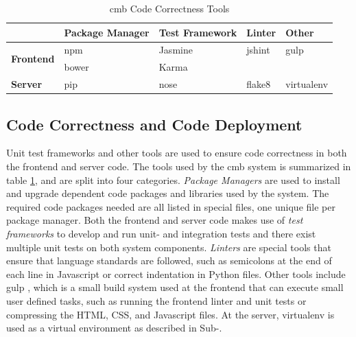 \begin{table}[b!]
  \centering
  \begin{tabular}{ l|p{2.1cm}|p{2.2cm}|l|l }
    & \textbf{Package Manager} & \raggedright\textbf{Test Framework} & \textbf{Linter} & \textbf{Other} \\ \hline
  \multirow{2}{*}{\textbf{Frontend}} & npm \cite{NPM} & Jasmine \cite{JASMINE} & jshint \cite{JSHINT} & gulp \cite{GULP} \\
                                     & bower \cite{BOWER} & Karma \cite{KARMA} &  &  \\ \hline
  \multirow{1}{*}{\textbf{Server}} & pip \cite{PIP} & nose \cite{NOSE} & flake8 \cite{FLAKE8} & virtualenv \cite{VIRTUALENV}\\
  \end{tabular}
  \caption{\gls{cmb} Code Correctness Tools}
  \label{tab:cct}
\end{table}

\subsection{Code Correctness and Code Deployment}
\label{sec:cmb-ci}
Unit test frameworks and other tools are used to ensure code correctness in both the frontend and server code. The tools used by the \gls{cmb} system is summarized in table \ref{tab:cct}, and are split into four categories. \textit{Package Managers} are used to install and upgrade dependent code packages and libraries used by the system. The required code packages needed are all listed in special files, one unique file per package manager. Both the frontend and server code makes use of \textit{test frameworks} to develop and run unit- and integration tests and there exist multiple unit tests on both system components. \textit{Linters} are special tools that ensure that language standards are followed, such as semicolons at the end of each line in Javascript or correct indentation in Python files. Other tools include gulp \cite{GULP}, which is a small build system used at the frontend that can execute small user defined tasks, such as running the frontend linter and unit tests or compressing the HTML, CSS, and Javascript files. At the server, virtualenv \cite{VIRTUALENV} is used as a virtual environment as described in Sub-. \\

